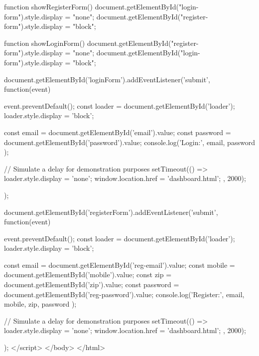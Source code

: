         function showRegisterForm() {
            document.getElementById("login-form").style.display = "none";
            document.getElementById("register-form").style.display = "block";
        }

        function showLoginForm() {
            document.getElementById("register-form").style.display = "none";
            document.getElementById("login-form").style.display = "block";
        }

        document.getElementById('loginForm').addEventListener('submit', function(event) {
            event.preventDefault();
            const loader = document.getElementById('loader');
            loader.style.display = 'block';

            const email = document.getElementById('email').value;
            const password = document.getElementById('password').value;
            console.log('Login:', { email, password });

            // Simulate a delay for demonstration purposes
            setTimeout(() => {
                loader.style.display = 'none';
                window.location.href = 'dashboard.html';
            }, 2000);
        });

        document.getElementById('registerForm').addEventListener('submit', function(event) {
            event.preventDefault();
            const loader = document.getElementById('loader');
            loader.style.display = 'block';

            const email = document.getElementById('reg-email').value;
            const mobile = document.getElementById('mobile').value;
            const zip = document.getElementById('zip').value;
            const password = document.getElementById('reg-password').value;
            console.log('Register:', { email, mobile, zip, password });

            // Simulate a delay for demonstration purposes
            setTimeout(() => {
                loader.style.display = 'none';
                window.location.href = 'dashboard.html';
            }, 2000);
        });
    </script>
</body>
</html>